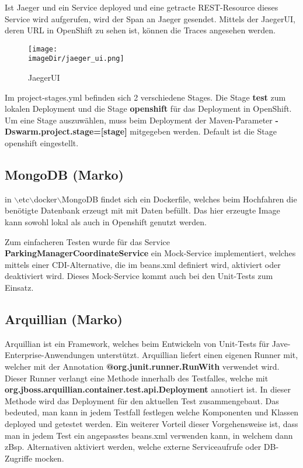 \documentclass[11pt, a4paper, twoside]{article}   	%
\newcommand{\imageDir}{../../images}
\begin{document}
Ist Jaeger und ein Service deployed und eine getracte REST-Resource dieses Service wird aufgerufen, wird der Span an Jaeger gesendet. Mittels der JaegerUI, deren URL in OpenShift zu sehen ist, können die Traces angesehen werden.

\begin{figure}[h]
	\centering
	\texttt{[image: \\imageDir/jaeger\_ui.png]}
	\caption{JaegerUI}
\end{figure}

Im project-stages.yml befinden sich 2 verschiedene Stages. Die Stage \textbf{test} zum lokalen Deployment und die Stage \textbf{openshift} für das Deployment in OpenShift.
Um eine Stage auszuwählen, muss beim Deployment der Maven-Parameter \textbf{-Dswarm.project.stage=[stage]} mitgegeben werden.
Default ist die Stage openshift eingestellt.

\subsection{MongoDB (Marko)}
in $\backslash$etc$\backslash$docker$\backslash$MongoDB findet sich ein Dockerfile, welches beim Hochfahren die benötigte Datenbank 
erzeugt mit mit Daten befüllt. Das hier erzeugte Image kann sowohl lokal als auch in Openshift genutzt 
werden.

Zum einfacheren Testen wurde für das Service \textbf{ParkingManagerCoordinateService} ein Mock-Service 
implementiert, welches mittels einer CDI-Alternative, die im beans.xml definiert wird, aktiviert oder 
deaktiviert wird. Dieses Mock-Service kommt auch bei den Unit-Tests zum Einsatz.

\subsection{Arquillian (Marko)}
Arquillian ist ein Framework, welches beim Entwickeln von Unit-Tests für Jave-Enterprise-Anwendungen unterstützt. Arquillian liefert 
einen eigenen Runner mit, welcher mit der Annotation \textbf{@org.junit.runner.RunWith} verwendet wird. Dieser Runner verlangt 
eine Methode innerhalb des Testfalles, welche mit \textbf{org.jboss.arquillian.container.test.api.Deployment} annotiert ist. 
In dieser Methode wird das Deployment für den aktuellen Test zusammengebaut. Das bedeuted, man kann in jedem Testfall festlegen welche 
Komponenten und Klassen deployed und getestet werden. Ein weiterer Vorteil dieser Vorgehensweise ist, dass man in jedem Test ein angepasstes 
beans.xml verwenden kann, in welchem dann zBsp. Alternativen aktiviert werden, welche externe Serviceaufrufe oder DB-Zugriffe mocken.
\end{document}
